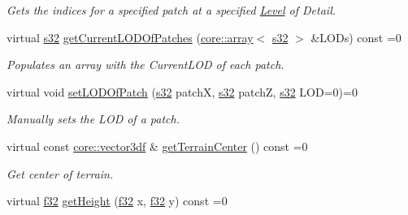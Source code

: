 \begin{DoxyCompactItemize}
\begin{DoxyCompactList}\small\item\em Gets the indices for a specified patch at a specified \hyperlink{classLevel}{Level} of Detail. \end{DoxyCompactList}\item 
virtual \hyperlink{namespaceirr_ac66849b7a6ed16e30ebede579f9b47c6}{s32} \hyperlink{classirr_1_1scene_1_1ITerrainSceneNode_a0d310851f0ebf1fce18d3a2c0f3dceab}{get\+Current\+L\+O\+D\+Of\+Patches} (\hyperlink{classirr_1_1core_1_1array}{core\+::array}$<$ \hyperlink{namespaceirr_ac66849b7a6ed16e30ebede579f9b47c6}{s32} $>$ \&L\+O\+Ds) const =0
\begin{DoxyCompactList}\small\item\em Populates an array with the Current\+L\+OD of each patch. \end{DoxyCompactList}\item 
virtual void \hyperlink{classirr_1_1scene_1_1ITerrainSceneNode_a41b7f1ee70511d648cc11217347160ad}{set\+L\+O\+D\+Of\+Patch} (\hyperlink{namespaceirr_ac66849b7a6ed16e30ebede579f9b47c6}{s32} patchX, \hyperlink{namespaceirr_ac66849b7a6ed16e30ebede579f9b47c6}{s32} patchZ, \hyperlink{namespaceirr_ac66849b7a6ed16e30ebede579f9b47c6}{s32} L\+OD=0)=0
\begin{DoxyCompactList}\small\item\em Manually sets the L\+OD of a patch. \end{DoxyCompactList}\item 
\mbox{\label{classirr_1_1scene_1_1ITerrainSceneNode_a804241f60c853e74fcb8687cd887f1b7}} 
virtual const \hyperlink{namespaceirr_1_1core_a06f169d08b5c429f5575acb7edbad811}{core\+::vector3df} \& \hyperlink{classirr_1_1scene_1_1ITerrainSceneNode_a804241f60c853e74fcb8687cd887f1b7}{get\+Terrain\+Center} () const =0
\begin{DoxyCompactList}\small\item\em Get center of terrain. \end{DoxyCompactList}\item 
\mbox{\label{classirr_1_1scene_1_1ITerrainSceneNode_a9289839822ea77496af62f311f01c8bb}} 
virtual \hyperlink{namespaceirr_a0277be98d67dc26ff93b1a6a1d086b07}{f32} \hyperlink{classirr_1_1scene_1_1ITerrainSceneNode_a9289839822ea77496af62f311f01c8bb}{get\+Height} (\hyperlink{namespaceirr_a0277be98d67dc26ff93b1a6a1d086b07}{f32} x, \hyperlink{namespaceirr_a0277be98d67dc26ff93b1a6a1d086b07}{f32} y) const =0

\end{DoxyCompactItemize}
